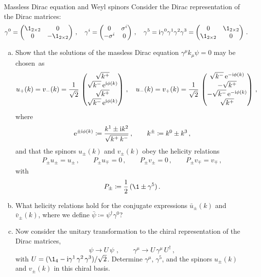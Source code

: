 \begin{exer}{Massless Dirac equation and Weyl spinors}
\label{Ex:1.2}
Consider the Dirac representation of the Dirac matrices:
\begin{align} \label{eq:gamma_dirac}
\gamma^{0}= \left ( \begin{matrix} {\1}_{2\times 2}& 0\cr 0& -{\1}_{2\times 2} 
\end{matrix}\right )\, ,\quad
\gamma^{i}= \left ( \begin{matrix} 0& {\sigma^{i}}\cr -{\sigma^{i}}
& 0 \end{matrix}\right )\, ,\quad
\gamma^{5}= \i\gamma^{0}\gamma^{1}\gamma^{2}\gamma^{3}=
\left ( \begin{matrix} 0 &{\1}_{2\times 2}\cr {\1}_{2\times 2} &0 
\end{matrix}\right )\, .
\end{align}
\begin{enumerate}[a)]
\item Show that the solutions of the massless Dirac equation $\gamma^{\mu} k_{\mu}\psi =0$
may be chosen~as
\begin{align}
u_{+}(k) =v_{-}(k) = \frac{1}{\sqrt{2}}\, \left (\begin{matrix} \sqrt{k^{+}}\cr
\sqrt{k^{-}}\, \mathrm{e}^{\mathrm{i}\phi(k)}\cr \sqrt{k^{+}}\cr
\sqrt{k^{-}}\, \mathrm{e}^{\mathrm{i}\phi(k)}\cr 
\end{matrix} \right )\, , \quad 
u_{-}(k) =v_{+}(k) = \frac{1}{\sqrt{2}}\, \left (\begin{matrix} \sqrt{k^{-}}\, \mathrm{e}^{-\mathrm{i}\phi(k)}\cr
-\sqrt{k^{+}}\cr -\sqrt{k^{-}}\, \mathrm{e}^{-\mathrm{i}\phi(k)}\cr
\sqrt{k^{+}}\cr 
\end{matrix} \right ) \,,
\end{align}
where 
\begin{align}
\mathrm{e}^{\pm \mathrm{i}\phi(k)}\coloneqq \frac{k^{1}\pm \mathrm{i} k^{2}}{\sqrt{k^{+}\,k^{-}}}\,, \qquad
k^{\pm}\coloneqq k^{0}\pm k^{3}\, ,
\end{align}
and that the spinors $u_{\pm}(k)$ and $v_{\pm}(k)$ obey the helicity
relations
\begin{align}
P_{\pm}u_{\pm}=u_{\pm}\, ,
\qquad 
P_{\pm}u_{\mp}=0\, , \qquad P_{\pm}v_{\pm}=0\, , \qquad
P_{\pm}v_{\mp}=v_{\mp}\, ,
\end{align}
with
\begin{align}
P_{\pm} \coloneqq\frac{1}{2}\, (\1 \pm \gamma^{5})\,.
\end{align}

\item What helicity relations hold for the conjugate expressions $\bar u_{\pm}(k)$ and
$\bar v_{\pm}(k)$, where we define $\bar\psi \coloneqq \psi^{\dagger}\gamma^{0}$?
\item Now consider the unitary transformation to the chiral representation of the Dirac matrices,
$$
\psi\to U\,  \psi\, \, ,\qquad \gamma^{\mu}\to U\, \gamma^{\mu}\, U^{\dagger} \, ,
$$
with $U= (\1_4 -\i \gamma^{1}\,\gamma^{2}\,\gamma^{3})/\sqrt{2}$.
Determine $\gamma^{\mu}$, $\gamma^{5}$, and the spinors $u_{\pm}(k)$ and $v_{\pm}(k)$ in this chiral basis.


\end{enumerate}
\end{exer}
